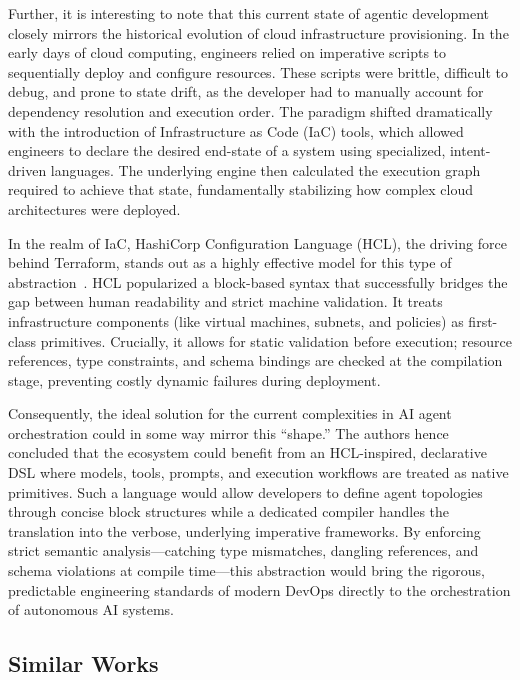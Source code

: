 \documentclass[sigconf,nonacm]{acmart}
\begin{document}
Further, it is interesting to note that this current state of agentic
development closely mirrors the historical evolution of cloud
infrastructure provisioning. In the early days of cloud computing,
engineers relied on imperative scripts to sequentially deploy and configure
resources. These scripts were brittle, difficult to debug, and prone to
state drift, as the developer had to manually account for dependency
resolution and execution order. The paradigm shifted dramatically with the
introduction of Infrastructure as Code (IaC) tools, which allowed
engineers to declare the desired end-state of a system using specialized,
intent-driven languages. The underlying engine then calculated the execution
graph required to achieve that state, fundamentally stabilizing how complex
cloud architectures were deployed.

In the realm of IaC, HashiCorp Configuration Language (HCL), the driving
force behind Terraform, stands out as a highly effective model for this type
of abstraction~\cite{terraform2024}. HCL popularized a block-based syntax
that successfully bridges the gap between human readability and strict
machine validation. It treats infrastructure components (like virtual
machines, subnets, and policies) as first-class primitives. Crucially, it
allows for static validation before execution; resource references, type
constraints, and schema bindings are checked at the compilation stage,
preventing costly dynamic failures during deployment.

Consequently, the ideal solution for the current complexities in AI agent
orchestration could in some way mirror this ``shape.'' The authors hence
concluded that the ecosystem could benefit from an HCL-inspired,
declarative DSL where models, tools, prompts, and execution workflows are
treated as native primitives. Such a language would allow developers to
define agent topologies through concise block structures while a dedicated
compiler handles the translation into the verbose, underlying imperative
frameworks. By enforcing strict semantic analysis---catching type mismatches,
dangling references, and schema violations at compile time---this abstraction
would bring the rigorous, predictable engineering standards of modern
DevOps directly to the orchestration of autonomous AI systems.

\subsection{Similar Works}
\label{sec:background:similar}
\end{document}

